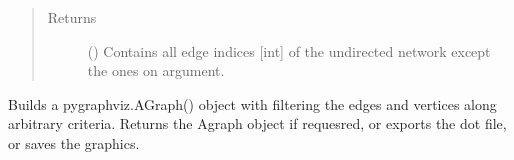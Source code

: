 \documentclass[letterpaper,10pt,english]{sphinxmanual}
\begin{document}
\begin{fulllineitems}
\begin{fulllineitems}
\begin{quote}
\begin{description}
\item[{Returns}] \leavevmode
() \textendash{} Contains all edge indices {[}int{]} of the
undirected network except the ones on  argument.

\end{description}\end{quote}

\end{fulllineitems}


\begin{fulllineitems}
\label{\detokenize{main:pypath.main.PyPath.export_dot}}
Builds a pygraphviz.AGraph() object with filtering the edges
and vertices along arbitrary criteria.
Returns the Agraph object if requesred, or exports the dot
file, or saves the graphics.


\end{fulllineitems}
\end{fulllineitems}
\end{document}
